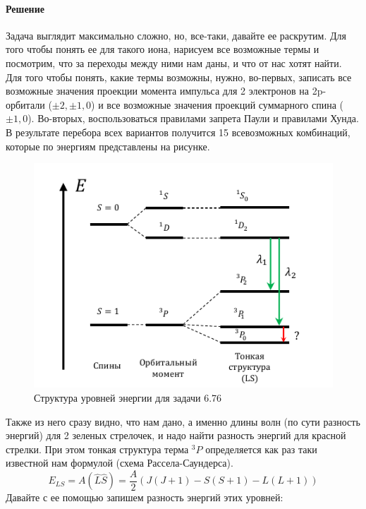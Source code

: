 \documentclass[12pt]{article}
\begin{document}
\paragraph{Решение}
Задача выглядит максимально сложно, но, все-таки, давайте ее раскрутим. Для того чтобы понять ее для такого иона, нарисуем все возможные термы и посмотрим, что за переходы между ними нам даны, и что от нас хотят найти. Для того чтобы понять, какие термы возможны, нужно, во-первых, записать все возможные значения проекции момента импульса для 2 электронов на 2p-орбитали ($\pm 2, \pm 1, 0$) и все возможные значения проекций суммарного спина ($\pm 1, 0$). Во-вторых, воспользоваться правилами запрета Паули и правилами Хунда. В результате перебора всех вариантов получится 15 всевозможных комбинаций, которые по энергиям представлены на рисунке. 
\begin{figure}[h]
    \centering
    \includegraphics[width=\textwidth,height=\textheight,keepaspectratio]{Seminar_07/pics/pic_04.pdf}
    \caption{Структура уровней энергии для задачи 6.76}
    \label{fig:sem_7_energy_levels}
\end{figure}
Также из него сразу видно, что нам дано, а именно длины волн (по сути разность энергий) для 2 зеленых стрелочек, и надо найти разность энергий для красной стрелки. При этом тонкая структура терма ${}^3P$ определяется как раз таки известной нам формулой (схема Рассела-Саундерса).
\begin{equation*}
    E_{LS} = A(\hat{L}\hat{S} ) = \dfrac{A}{2}\left(J(J+1) - S(S+1) -L(L+1) \right)
\end{equation*}
Давайте с ее помощью запишем разность энергий этих уровней:
\end{document}
